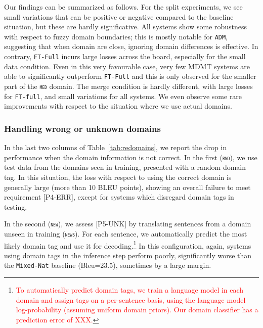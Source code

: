 \documentclass[11pt,a4paper]{article}
\newcommand{\fyDone}[1]{\done[FY]\Todo[FY:]{\textcolor{orange}{#1}}}
\newcommand{\revision}[1]{\textcolor{red}{#1}}
\newcommand{\domain}[1]{\texttt{\textsc{#1}}}
\newcommand{\system}[1]{\texttt{{#1}}}
\begin{document}
Our findings can be summarized as follows. For the split experiments, we see small variations that can be positive or negative compared to the baseline situation, but these are hardly significative. All systems show some robustness with respect to fuzzy domain boundaries; this is mostly notable for \system{ADM}, suggesting that when domain are close, ignoring domain differences is effective. In contrary, \system{FT-Full} incurs large losses across the board, especially for the small data condition. Even in this very favourable case, very few MDMT systems are able to significantly outperform \system{FT-Full} and this is only observed for the smaller part of the \domain{med} domain. The merge condition is hardly different, with large losses for \system{FT-full}, and small variations for all systems. We even observe some rare improvements with respect to the situation where we use actual domains.\fyDone{More comments ?}

\subsubsection{Handling wrong or unknown domains \label{sssec:unknowns}}

\fyDone{Numbers for the rand domain analysis}In the last two columns of Table~\ref{tab:redomains}, we report the drop in performance when the domain information is not correct. In the first (\domain{rnd}), we use test data from the domains seen in training, presented with a random domain tag\fyDone{all configs use the same tag or is randomization is run for each config}. In this situation, the loss with respect to using the correct domain is generally large (more than 10 BLEU points), showing an overall failure to meet requirement [P4-ERR], except for systems which disregard domain tags in testing. \fyDone{Comments?}

In the second (\domain{new}), we assess [P5-UNK] by translating sentences from a domain unseen in training (\domain{news}).\fyDone{i would use RND / UNK rather than OLD / NEW} For each sentence, we automatically predict the most likely domain tag and use it for decoding.\footnote{\revision{To automatically predict domain tags, we train a language model in each domain and assign tags on a per-sentence basis, using the language model log-probability (assuming uniform domain priors). Our domain classifier has a prediction error of XXX.}}
In this configuration, again, systems using domain tags in the inference step perform poorly, significantly worse than the \system{Mixed-Nat} baseline (Bleu=23.5)\fyDone{performance drop is now measured against Mixed-nat (leave it clearer?)}, sometimes by a large margin.\fyDone{Check significance, To be completed}
\end{document}
